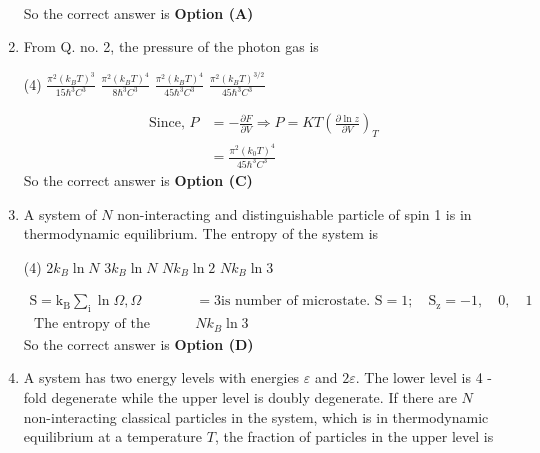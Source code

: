 \begin{enumerate}
\begin{answer}
\begin{align*}
		\end{align*}
		So the correct answer is \textbf{Option (A)}
	\end{answer}
	\item From Q. no. 2, the pressure of the photon gas is
	{}
	\begin{tasks}(4)
		\task[\textbf{A.}] $\frac{\pi^{2}\left(k_{B} T\right)^{3}}{15 \hbar^{3} C^{3}}$
		\task[\textbf{B.}]  $\frac{\pi^{2}\left(k_{B} T\right)^{4}}{8 \hbar^{3} C^{3}}$
		\task[\textbf{C.}] $\frac{\pi^{2}\left(k_{B} T\right)^{4}}{45 \hbar^{3} C^{3}}$
		\task[\textbf{D.}] $\frac{\pi^{2}\left(k_{B} T\right)^{3 / 2}}{45 \hbar^{3} C^{3}}$
	\end{tasks}
	\begin{answer}
		\begin{align*}
		\text{Since, }P&=-\frac{\partial F}{\partial V} \Rightarrow P=K T\left(\frac{\partial \ln z}{\partial V}\right)_{T}\\&=\frac{\pi^{2}\left(k_{0} T\right)^{4}}{45 \hbar^{3} C^{3}}
		\end{align*}
		So the correct answer is \textbf{Option (C)}
	\end{answer}
	\item A system of $N$ non-interacting and distinguishable particle of spin 1 is in thermodynamic equilibrium. The entropy of the system is
	{}
	\begin{tasks}(4)
		\task[\textbf{A.}] $2 k_{B} \ln N$
		\task[\textbf{B.}] $3 k_{B} \ln N$
		\task[\textbf{C.}] $N k_{B} \ln 2$
		\task[\textbf{D.}] $N k_{B} \ln 3$
	\end{tasks}
	\begin{answer}
		\begin{align*}
		\mathrm{S}=\mathrm{k}_{\mathrm{B}} \sum_{\mathrm{i}} \ln \Omega, \Omega&=3 \text{is number of microstate. }\mathrm{S}=1 ; \quad \mathrm{S}_{\mathrm{z}}=-1, \quad 0, \quad 1\\
		\text{	The entropy of the system is }& N k_{B} \ln 3
		\end{align*}
		So the correct answer is \textbf{Option (D)}
	\end{answer}	
	\item A system has two energy levels with energies $\varepsilon$ and $2 \varepsilon .$ The lower level is 4 -fold degenerate while the upper level is doubly degenerate. If there are $N$ non-interacting classical particles in the system, which is in thermodynamic equilibrium at a temperature $T$, the fraction of particles in the upper level is
	{}

\end{enumerate}
